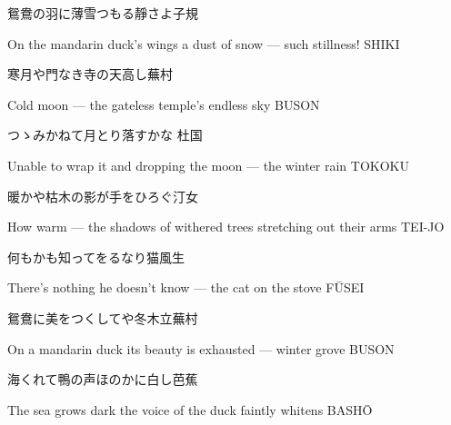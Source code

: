 \begin{haiku}
    {\FH 鴛鴦の羽に薄雪つもる靜さよ}\hfill{\FH 子規}

    \vin{} On the mandarin duck's wings
    \vin{} \vin{} a dust of snow ---
    \vin{} \vin{} \vin{} such stillness! \hspace{\fill} SHIKI
\end{haiku}

\begin{haiku}
    {\FH 寒月や門なき寺の天高し}\hfill{\FH 蕪村}

    \vin{} Cold moon ---
    \vin{} \vin{} the gateless temple's
    \vin{} \vin{} \vin{} endless sky \hspace{\fill} BUSON
\end{haiku}

\begin{haiku}
    {\FH つゝみかねて月とり落すかな }\hfill{\FH 杜国}

    \vin{} Unable to wrap it
    \vin{} \vin{} and dropping the moon ---
    \vin{} \vin{} \vin{} the winter rain \hspace{\fill} TOKOKU
\end{haiku}

\begin{haiku}
    {\FH 暖かや枯木の影が手をひろぐ}\hfill{\FH 汀女}

    \vin{} How warm ---
    \vin{} \vin{} the shadows of withered trees
    \vin{} \vin{} \vin{} stretching out their arms \hspace{\fill} TEI-JO
\end{haiku}

\begin{haiku}
    {\FH 何もかも知ってをるなり猫}\hfill{\FH 風生}

    \vin{} There's nothing
    \vin{} \vin{} he doesn't know ---
    \vin{} \vin{} \vin{} the cat on the stove \hspace{\fill} F\={U}SEI
\end{haiku}

\begin{haiku}
    {\FH 鴛鴦に美をつくしてや冬木立}\hfill{\FH 蕪村}

    \vin{} On a mandarin duck
    \vin{} \vin{} its beauty is exhausted ---
    \vin{} \vin{} \vin{} winter grove \hspace{\fill} BUSON
\end{haiku}

\begin{haiku}
    {\FH 海くれて鴨の声ほのかに白し}\hfill{\FH 芭蕉}

    \vin{} The sea grows dark
    \vin{} \vin{} the voice of the duck
    \vin{} \vin{} \vin{} faintly whitens \hspace{\fill} BASH\={O}
\end{haiku}

